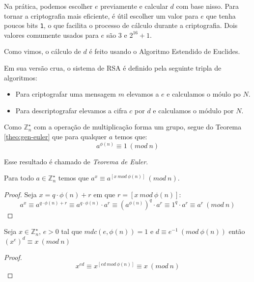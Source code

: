 Na prática, podemos escolher $e$ previamente e calcular $d$ com base nisso.
Para tornar a criptografia mais eficiente, é útil escolher um valor para $e$ que tenha poucos bits {\tt 1}, o que facilita o processo de cálculo durante a criptografia.
Dois valores comumente usados para $e$ são $3$ e $2^{16} + 1$.

Como vimos, o cálculo de $d$ é feito usando o Algoritmo Estendido de Euclides.



Em sua versão crua, o sistema de RSA é definido pela seguinte tripla de algoritmos:

\begin{itemize}
\item Para criptografar uma mensagem $m$ elevamos a $e$ e calculamos o móulo po $N$. 
\item Para descriptografar elevamos a cifra $c$ por $d$ e calculamos o módulo por $N$.
\end{itemize}

Como $\mathbb{Z}_n^\star$ com a operação de multiplicação forma um grupo, segue do Teorema \ref{theo:gen-euler} que para qualquer $a$ temos que:
\begin{displaymath}
  a^{\phi(n)} \equiv 1\ (mod\ n)
\end{displaymath}

Esse resultado é chamado de {\em Teorema de Euler}.

\begin{corollary}
  Para todo $a \in \mathbb{Z}_n^\star$ temos que $a^x \equiv a^{[x\ mod\ \phi(n)]}\ (mod\ n)$.
\end{corollary}
\begin{proof}
  Seja $x = q \cdot \phi(n) + r$ em que $r = [x\ mod\ \phi(n)]$:
  \begin{displaymath}
    a^x \equiv a^{q \cdot \phi(n) + r} \equiv a^{q \cdot \phi(n)} \cdot a^r \equiv (a^{\phi(n)})^q \cdot a^r \equiv 1^q \cdot a^r \equiv a^r\ (mod\ n)
  \end{displaymath}
\end{proof}


\begin{corollary}
\label{cor:euler}
Seja $x \in \mathbb{Z}_n^\star$, $e > 0$ tal que $mdc(e, \phi(n)) = 1$ e $d \equiv e^{-1}\ (mod\ \phi(n))$ então $(x^e)^d \equiv x\ (mod\ n)$
\end{corollary}

\begin{proof}
  \begin{displaymath}
    x^{ed} \equiv x^{[ed\ mod\ \phi(n)]} \equiv x\ (mod\ n)
  \end{displaymath}
\end{proof}

